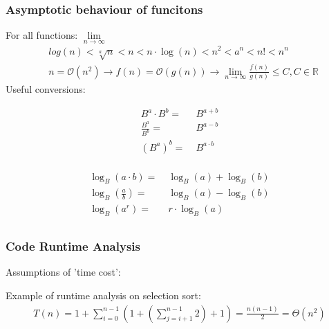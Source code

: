     \subsubsection{Asymptotic behaviour of funcitons}
        For all functions: $\lim\limits_{n \rightarrow \infty}$
        \begin{align*}
            &log(n) < \sqrt[a]{n} < n < n \cdot \log(n) < n^2 < a^n < n! < n^n\\
            &n = \mathcal{O}(n^2) \rightarrow f(n) = \mathcal{O}(g(n)) \rightarrow \lim\limits_{n \rightarrow \infty} \frac{f(n)}{g(n)} \leq C, C \in \mathbb{R}
        \end{align*}
        Useful conversions:\\
        \begin{minipage}{0.29\linewidth}
            \begin{align*}
                B^a \cdot B^b =& \; B^{a + b}\\
                \frac{B^a}{B^b} =& \; B^{a - b}\\
                (B^a)^b =& \; B^{a \cdot b}\\
            \end{align*}
        \end{minipage}
        \begin{minipage}{0.69\linewidth}
            \begin{align*}
                \log_B (a \cdot b ) =& \; \log_B (a) + \log_B (b)\\
                \log_B \left( \frac{a}{b} \right) =& \; \log_B (a) - \log_B (b)\\
                \log_B (a^r) =& \; r \cdot \log_B (a)\\
            \end{align*}
        \end{minipage}
    
    \subsubsection{Code Runtime Analysis}
        Assumptions of 'time cost':
        

        Example of runtime analysis on selection sort:
        \begin{align*}
            T(n) = 1 + \sum_{i = 0}^{n-1} \left( 1 + \left(\sum_{j = i+1}^{n-1} 2 \right) + 1\right) = \frac{n (n-1)}{2} = \Theta(n^2)
        \end{align*}
        
